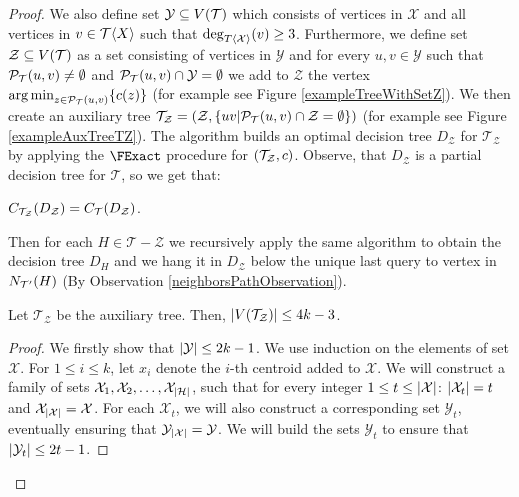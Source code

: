 \begin{theorem}
\begin{proof}
We also define set $\mathcal{Y}\subseteq V\mathopen{}\left( \mathcal{T} \right)$ which consists of vertices in $\mathcal{X}$ and all vertices in $v\in \mathcal{T}\mathopen{}\langle X \rangle$ such that $\deg_{T\mathopen{}\langle \mathcal{X} \rangle}\mathopen{}\left( v \right)\geq 3$.
Furthermore, we define set $\mathcal{Z}\subseteq V\mathopen{}\left( \mathcal{T} \right)$ as a set consisting of vertices in $\mathcal{Y}$ and for every $u,v\in \mathcal{Y}$ such that $\mathcal{P}_{\mathcal{T}}\mathopen{}\left( u, v \right)\neq\emptyset$ and $\mathcal{P}_{\mathcal{T}}\mathopen{}\left( u, v \right)\cap \mathcal{Y}=\emptyset$ we add to $\mathcal{Z}$ the vertex $\operatorname*{arg\,min}_{z\in \mathcal{P}_{\mathcal{T}}\mathopen{}\left( u, v \right)}\mathopen{}\left\{ c\mathopen{}\left( z \right) \right\}$ (for example see Figure \ref{exampleTreeWithSetZ}). We then create an auxiliary tree $\mathcal{T}_{\mathcal{Z}}=\mathopen{}\left( \mathcal{Z},\mathopen{}\left\{ uv|\mathcal{P}_{\mathcal{T}}\mathopen{}\left( u, v \right)\cap \mathcal{Z}=\emptyset \right\} \right)$ (for example see Figure \ref{exampleAuxTreeTZ}). The algorithm builds an optimal decision tree $D_{\mathcal{Z}}$ for $\mathcal{T}_{\mathcal{Z}}$ by applying the $\FExact$ procedure for $\mathopen{}\left( \mathcal{T}_{\mathcal{Z}},c \right)$. Observe, that $D_{\mathcal{Z}}$ is a  partial decision tree for $\mathcal{T}$, so we get that:
\begin{observation}\label{observation:CostDZinT}
    $C_{\mathcal{T}_{\mathcal{Z}}}\mathopen{}\left( D_{\mathcal{Z}} \right)=C_{\mathcal{T}}\mathopen{}\left( D_{\mathcal{Z}} \right)$.
\end{observation}
Then for each $H\in \mathcal{T}-\mathcal{Z}$ we recursively apply the same algorithm to obtain the decision tree $D_H$ and we hang it in $D_\mathcal{Z}$ below the unique last query to vertex in $N_{\mathcal{T}'}\mathopen{}\left( H \right)$ (By Observation \ref{neighborsPathObservation}).



\begin{lemma}\label{lemma:auxTreeSize}
    Let $\mathcal{T}_{\mathcal{Z}}$ be the auxiliary tree. Then, $\mathopen{}\left| V\mathopen{}\left( \mathcal{T}_{\mathcal{Z}} \right) \right|\leq 4k-3$.
    \begin{proof}
        We firstly show that $\mathopen{}\left| \mathcal{Y} \right|\leq 2k-1$. We use induction on the elements of set $\mathcal{X}$. For $1\leq i\leq k$, let $x_i$ denote the $i$-th centroid added to $\mathcal{X}$. We will construct a family of sets $\mathcal{X}_1, \mathcal{X}_2,\dots, \mathcal{X}_{\mathopen{}\left| \mathcal{H} \right|}$, such that for every integer $1\leq t\leq \mathopen{}\left| \mathcal{X} \right|$: $\mathopen{}\left| \mathcal{X}_t \right|=t$ and $\mathcal{X}_{\mathopen{}\left| \mathcal{X} \right|}=\mathcal{X}$. For each $\mathcal{X}_t$, we will also construct a corresponding set $\mathcal{Y}_t$, eventually ensuring that $\mathcal{Y}_{\mathopen{}\left| \mathcal{X} \right|}=\mathcal{Y}$. We will build the sets $\mathcal{Y}_{t}$ to ensure that $\mathopen{}\left| \mathcal{Y}_t \right|\leq 2t-1$. 
        

\end{proof}
\end{lemma}
\end{proof}
\end{theorem}
